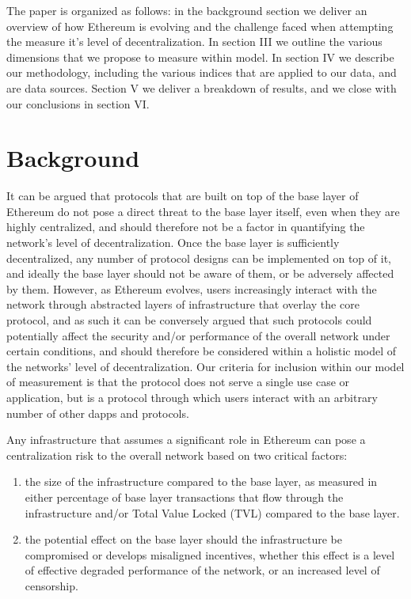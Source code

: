 \documentclass[conference]{IEEEtran}
\begin{document}
The paper is organized as follows: in the background section we deliver an overview of how Ethereum is evolving and the challenge faced when attempting the measure it's level of decentralization.  In section III we outline the various dimensions that we propose to measure within model.  In section IV we describe our methodology, including the various indices that are applied to our data, and are data sources.  Section V we deliver a breakdown of results, and we close with our conclusions in section VI.

\section{Background}

It can be argued that protocols that are built on top of the base layer of Ethereum do not pose a direct threat to the base layer itself, even when they are highly centralized, and should therefore not be a factor in quantifying the network's level of decentralization.  Once the base layer is sufficiently decentralized, any number of protocol designs can be implemented on top of it, and ideally the base layer should not be aware of them, or be adversely affected by them.  However, as Ethereum evolves, users increasingly interact with the network through abstracted layers of infrastructure that overlay the core protocol, and as such it can be conversely argued that such protocols could potentially affect the security and/or performance of the overall network under certain conditions, and should therefore be considered within a holistic model of the networks' level of decentralization.   Our criteria for inclusion within our model of measurement is that the protocol does not serve a single use case or application, but is a protocol through which users interact with an arbitrary number of other dapps and protocols.

Any infrastructure that assumes a significant role in Ethereum can pose a centralization risk to the overall network based on two critical factors:
\begin{enumerate}[label=\alph*.]
\item the size of the infrastructure compared to the base layer, as measured in either percentage of base layer transactions that flow through the infrastructure and/or Total Value Locked (TVL) compared to the base layer.
\item the potential effect on the base layer should the infrastructure be compromised or develops misaligned incentives, whether this effect is a level of effective degraded performance of the network, or an increased level of censorship.
\end{enumerate}
\end{document}
